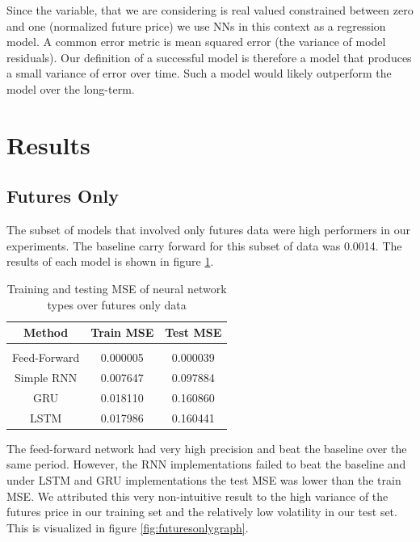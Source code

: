 \documentclass[twoside,11pt]{article}
\begin{document}
Since the variable, that we are considering is real valued constrained between zero and one (normalized future price) we use NNs in this context as a regression model. A common error metric is mean squared error (the variance of model residuals). Our definition of a successful model is therefore a model that produces a small variance of error over time. Such a model would likely outperform the model over the long-term. 

\section{Results} \label{results}

\subsection{Futures Only}

The subset of models that involved only futures data were high performers in our experiments. The baseline carry forward for this subset of data was 0.0014. The results of each model is shown in figure \ref{tab:futuresonly}.

\begin{table}[h!]
	\begin{center}
		\begin{tabular}{ccc}
		    Method & Train MSE & Test MSE \\
		\hline \\[-11pt]
		Feed-Forward & 0.000005 & 0.000039 \\
		Simple RNN & 0.007647 & 0.097884 \\ 
	    GRU & 0.018110 & 0.160860 \\
		LSTM & 0.017986 & 0.160441 \\
		\hline
		\end{tabular}
	  \label{tab:futuresonly}
		\caption{Training and testing MSE of neural network types over futures only data}
	\end{center}
\end{table}

The feed-forward network had very high precision and beat the baseline over the same period. However, the RNN implementations failed to beat the baseline and under LSTM and GRU implementations the test MSE was lower than the train MSE. We attributed this very non-intuitive result to the high variance of the futures price in our training set and the relatively low volatility in our test set. This is visualized in figure \ref{fig:futuresonlygraph}. 
\end{document}
